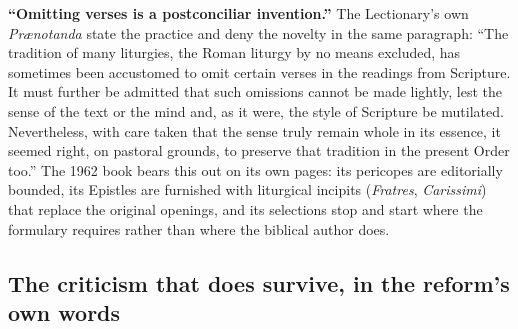 \textbf{``Omitting verses is a postconciliar invention.''} The Lectionary's own \emph{Prænotanda} state the practice and deny the novelty in the same paragraph: ``The tradition of many liturgies, the Roman liturgy by no means excluded, has sometimes been accustomed to omit certain verses in the readings from Scripture. It must further be admitted that such omissions cannot be made lightly, lest the sense of the text or the mind and, as it were, the style of Scripture be mutilated. Nevertheless, with care taken that the sense truly remain whole in its essence, it seemed right, on pastoral grounds, to preserve that tradition in the present Order too.'' The 1962 book bears this out on its own pages: its pericopes are editorially bounded, its Epistles are furnished with liturgical incipits (\emph{Fratres}, \emph{Carissimi}) that replace the original openings, and its selections stop and start where the formulary requires rather than where the biblical author does.

\subsection{The criticism that does survive, in the reform's own words}


